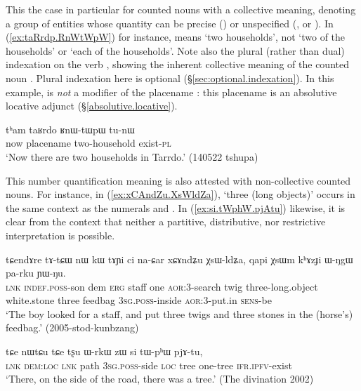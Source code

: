 This the case in particular for counted nouns with a collective meaning, denoting a group of entities whose quantity can be precise () or unspecified (,  or ). In (\ref{ex:taRrdp.RnWtWpW}) for instance,  means `two households', not `two of the households' or `each of the households'. Note also the plural (rather than dual) indexation on the verb , showing the inherent collective meaning of the counted noun . Plural indexation here is optional (§\ref{sec:optional.indexation}). In this example,  is \textit{not} a modifier of the placename : this placename is an absolutive locative adjunct (§\ref{absolutive.locative}).

\begin{exe}
	\ex \label{ex:taRrdp.RnWtWpW}
	\gll tʰam taʁrdo ʁnɯ-tɯpɯ tu-nɯ \\
	now placename two-household exist-\textsc{pl} \\
	\glt `Now there are two households in Tarrdo.' (140522 tshupa)
\end{exe} 


This number quantification meaning is also attested with non-collective counted nouns. For instance, in (\ref{ex:xCAndZu.XsWldZa}),  `three (long objects)' occurs in the same context as the numerals  and . In (\ref{ex:si.tWphW.pjAtu}) likewise, it is clear from the context that neither a partitive, distributive, nor restrictive interpretation is possible.

\begin{exe}
	\ex \label{ex:xCAndZu.XsWldZa}
	\gll tɕendɤre tɤ-tɕɯ nɯ kɯ tɤɲi ci na-ɕar xɕɤndʑu χsɯ-ldʑa, qapi χsɯm kʰɤzɟi ɯ-ŋgɯ pa-rku ɲɯ-ŋu. \\
	\textsc{lnk} \textsc{indef}.\textsc{poss}-son dem \textsc{erg} staff one \textsc{aor}:3\flobv{}-search twig three-long.object white.stone three feedbag \textsc{3sg}.\textsc{poss}-inside \textsc{aor}:3\flobv{}-put.in \textsc{sens}-be \\
	\glt `The boy looked for a staff, and put three twigs and three stones in the (horse's) feedbag.' (2005-stod-kunbzang)
\end{exe} 

\begin{exe}
	\ex \label{ex:si.tWphW.pjAtu}
	\gll tɕe nɯtɕu tɕe tʂu ɯ-rkɯ zɯ si tɯ-pʰɯ pjɤ-tu,  \\
	\textsc{lnk} \textsc{dem}:\textsc{loc} \textsc{lnk} path \textsc{3sg}.\textsc{poss}-side \textsc{loc} tree one-tree \textsc{ifr}.\textsc{ipfv}-exist \\
	\glt `There, on the side of the road, there was a tree.' (The divination 2002)
\end{exe} 

